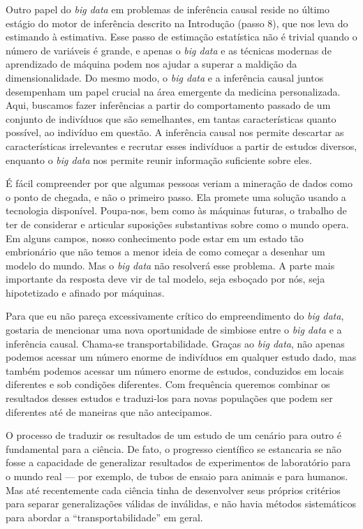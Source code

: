 \documentclass[11pt,a5paper,twoside]{book}
\begin{document}
Outro papel do \textit{big data} em problemas de inferência causal reside no último estágio do motor de inferência descrito na Introdução (passo 8), que nos leva do estimando à estimativa. Esse passo de estimação estatística não é trivial quando o número de variáveis é grande, e apenas o \textit{big data} e as técnicas modernas de aprendizado de máquina podem nos ajudar a superar a maldição da dimensionalidade. Do mesmo modo, o \textit{big data} e a inferência causal juntos desempenham um papel crucial na área emergente da medicina personalizada. Aqui, buscamos fazer inferências a partir do comportamento passado de um conjunto de indivíduos que são semelhantes, em tantas características quanto possível, ao indivíduo em questão. A inferência causal nos permite descartar as características irrelevantes e recrutar esses indivíduos a partir de estudos diversos, enquanto o \textit{big data} nos permite reunir informação suficiente sobre eles.

É fácil compreender por que algumas pessoas veriam a mineração de dados como o ponto de chegada, e não o primeiro passo. Ela promete uma solução usando a tecnologia disponível. Poupa-nos, bem como às máquinas futuras, o trabalho de ter de considerar e articular suposições substantivas sobre como o mundo opera. Em alguns campos, nosso conhecimento pode estar em um estado tão embrionário que não temos a menor ideia de como começar a desenhar um modelo do mundo. Mas o \textit{big data} não resolverá esse problema. A parte mais importante da resposta deve vir de tal modelo, seja esboçado por nós, seja hipotetizado e afinado por máquinas.

Para que eu não pareça excessivamente crítico do empreendimento do \textit{big data}, gostaria de mencionar uma nova oportunidade de simbiose entre o \textit{big data} e a inferência causal. Chama-se transportabilidade. Graças ao \textit{big data}, não apenas podemos acessar um número enorme de indivíduos em qualquer estudo dado, mas também podemos acessar um número enorme de estudos, conduzidos em locais diferentes e sob condições diferentes. Com frequência queremos combinar os resultados desses estudos e traduzi-los para novas populações que podem ser diferentes até de maneiras que não antecipamos.

O processo de traduzir os resultados de um estudo de um cenário para outro é fundamental para a ciência. De fato, o progresso científico se estancaria se não fosse a capacidade de generalizar resultados de experimentos de laboratório para o mundo real — por exemplo, de tubos de ensaio para animais e para humanos. Mas até recentemente cada ciência tinha de desenvolver seus próprios critérios para separar generalizações válidas de inválidas, e não havia métodos sistemáticos para abordar a “transportabilidade” em geral.
\end{document}
